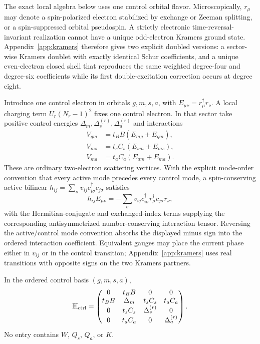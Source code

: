 \documentclass[11pt]{article}
\theoremstyle{definition}
\theoremstyle{remark}
\begin{document}
The exact local algebra below uses one control orbital flavor.  Microscopically, $r_\mu$ may denote a spin-polarized electron stabilized by exchange or Zeeman splitting, or a spin-suppressed orbital pseudospin.  A strictly electronic time-reversal-invariant realization cannot have a unique odd-electron Kramers ground state.  Appendix~\ref{app:kramers} therefore gives two explicit doubled versions: a sector-wise Kramers doublet with exactly identical Schur coefficients, and a unique even-electron closed shell that reproduces the same weighted degree-four and degree-six coefficients while its first double-excitation correction occurs at degree eight.

Introduce one control electron in orbitals $g,m,s,a$, with $E_{\mu\nu}=r_\mu^\dagger r_\nu$.  A local charging term $U_r(N_r-1)^2$ fixes one control electron.  In that sector take positive control energies $\Delta_m,\Delta_s^{(r)},\Delta_a^{(r)}$ and interactions
\begin{align}
 V_{gm}&=t_BB(E_{mg}+E_{gm}),\nonumber\\
 V_{ms}&=t_sC_s(E_{sm}+E_{ms}),\nonumber\\
 V_{ma}&=t_aC_a(E_{am}+E_{ma}).
 \label{eq:control-vertices}
\end{align}
These are ordinary two-electron scattering vertices.  With the explicit mode-order convention that every active mode precedes every control mode, a spin-conserving active bilinear $h_{ij}=\sum_\sigma v_{ij}c_{i\sigma}^\dagger c_{j\sigma}$ satisfies
\begin{equation}
 h_{ij}E_{\mu\nu}
 =-\sum_\sigma v_{ij}
 c_{i\sigma}^\dagger r_\mu^\dagger c_{j\sigma}r_\nu,
 \label{eq:normal-four-fermion}
\end{equation}
with the Hermitian-conjugate and exchanged-index terms supplying the corresponding antisymmetrized number-conserving interaction tensor.  Reversing the active/control mode convention absorbs the displayed minus sign into the ordered interaction coefficient.  Equivalent gauges may place the current phase either in $v_{ij}$ or in the control transition; Appendix~\ref{app:kramers} uses real transitions with opposite signs on the two Kramers partners.

In the ordered control basis $(g,m,s,a)$,
\begin{equation}
 \mathbb H_{\rm ctrl}=
 \begin{pmatrix}
 0&t_BB&0&0\\
 t_BB&\Delta_m&t_sC_s&t_aC_a\\
 0&t_sC_s&\Delta_s^{(r)}&0\\
 0&t_aC_a&0&\Delta_a^{(r)}
 \end{pmatrix}.
 \label{eq:control-matrix}
\end{equation}
No entry contains $W$, $Q_s$, $Q_a$, or $K$.
\end{document}

